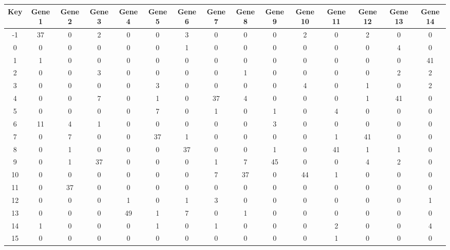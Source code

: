 \begin{tabular}{|c|c|c|c|c|c|c|c|c|c|c|c|c|c|c|}
\hline
Key & Gene 1 & Gene 2 & Gene 3 & Gene 4 & Gene 5 & Gene 6 & Gene 7 & Gene 8 & Gene 9 & Gene 10 & Gene 11 & Gene 12 & Gene 13 & Gene 14 \\
\hline
-1 & 37 & 0 & 2 & 0 & 0 & 3 & 0 & 0 & 0 & 2 & 0 & 2 & 0 & 0 \\
0 & 0 & 0 & 0 & 0 & 0 & 1 & 0 & 0 & 0 & 0 & 0 & 0 & 4 & 0 \\
1 & 1 & 0 & 0 & 0 & 0 & 0 & 0 & 0 & 0 & 0 & 0 & 0 & 0 & 41 \\
2 & 0 & 0 & 3 & 0 & 0 & 0 & 0 & 1 & 0 & 0 & 0 & 0 & 2 & 2 \\
3 & 0 & 0 & 0 & 0 & 3 & 0 & 0 & 0 & 0 & 4 & 0 & 1 & 0 & 2 \\
4 & 0 & 0 & 7 & 0 & 1 & 0 & 37 & 4 & 0 & 0 & 0 & 1 & 41 & 0 \\
5 & 0 & 0 & 0 & 0 & 7 & 0 & 1 & 0 & 1 & 0 & 4 & 0 & 0 & 0 \\
6 & 11 & 4 & 1 & 0 & 0 & 0 & 0 & 0 & 3 & 0 & 0 & 0 & 0 & 0 \\
7 & 0 & 7 & 0 & 0 & 37 & 1 & 0 & 0 & 0 & 0 & 1 & 41 & 0 & 0 \\
8 & 0 & 1 & 0 & 0 & 0 & 37 & 0 & 0 & 1 & 0 & 41 & 1 & 1 & 0 \\
9 & 0 & 1 & 37 & 0 & 0 & 0 & 1 & 7 & 45 & 0 & 0 & 4 & 2 & 0 \\
10 & 0 & 0 & 0 & 0 & 0 & 0 & 7 & 37 & 0 & 44 & 1 & 0 & 0 & 0 \\
11 & 0 & 37 & 0 & 0 & 0 & 0 & 0 & 0 & 0 & 0 & 0 & 0 & 0 & 0 \\
12 & 0 & 0 & 0 & 1 & 0 & 1 & 3 & 0 & 0 & 0 & 0 & 0 & 0 & 1 \\
13 & 0 & 0 & 0 & 49 & 1 & 7 & 0 & 1 & 0 & 0 & 0 & 0 & 0 & 0 \\
14 & 1 & 0 & 0 & 0 & 1 & 0 & 1 & 0 & 0 & 0 & 2 & 0 & 0 & 4 \\
15 & 0 & 0 & 0 & 0 & 0 & 0 & 0 & 0 & 0 & 0 & 1 & 0 & 0 & 0 \\
\hline
\end{tabular}